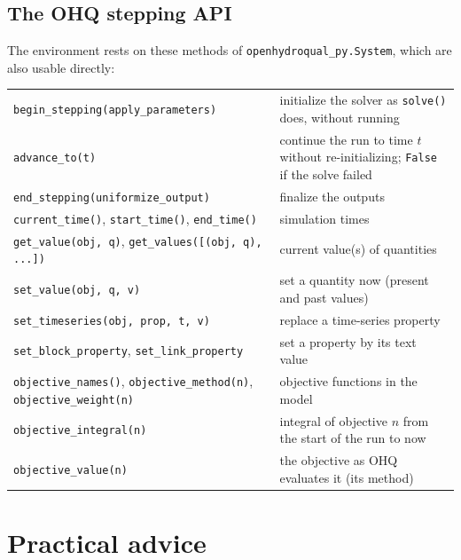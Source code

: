 \documentclass[11pt]{article}
\newcommand{\code}[1]{\texttt{#1}}
\begin{document}
\subsection{The OHQ stepping API}
The environment rests on these methods of \code{openhydroqual\_py.System},
which are also usable directly:
\begin{center}\small
\begin{tabular}{@{}p{6.2cm}p{8.6cm}@{}}
\toprule
\code{begin\_stepping(apply\_parameters)} & initialize the solver as \code{solve()} does, without running\\
\code{advance\_to(t)} & continue the run to time $t$ without re-initializing; \code{False} if the solve failed\\
\code{end\_stepping(uniformize\_output)} & finalize the outputs\\
\code{current\_time()}, \code{start\_time()}, \code{end\_time()} & simulation times\\
\code{get\_value(obj, q)}, \code{get\_values([(obj, q), ...])} & current value(s) of quantities\\
\code{set\_value(obj, q, v)} & set a quantity now (present and past values)\\
\code{set\_timeseries(obj, prop, t, v)} & replace a time-series property\\
\code{set\_block\_property}, \code{set\_link\_property} & set a property by its text value\\
\code{objective\_names()}, \code{objective\_method(n)}, \code{objective\_weight(n)} & objective functions in the model\\
\code{objective\_integral(n)} & integral of objective $n$ from the start of the run to now\\
\code{objective\_value(n)} & the objective as OHQ evaluates it (its method)\\
\bottomrule
\end{tabular}
\end{center}

\section{Practical advice}
\end{document}
